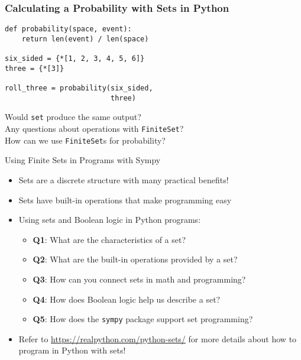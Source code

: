 \documentclass[14pt,aspectratio=169]{beamer}
\begin{document}
%
\begin{frame}[fragile]
  \frametitle{Calculating a Probability with Sets in Python}
  \normalsize
  \begin{minipage}{6in}
    \vspace*{.25in}
    \begin{verbatim}
def probability(space, event):
    return len(event) / len(space)

six_sided = {*[1, 2, 3, 4, 5, 6]}
three = {*[3]}

roll_three = probability(six_sided,
                         three)
    \end{verbatim}
  \end{minipage}
  \vspace*{.25in}
  \begin{center}
    \normalsize \noindent Would {\tt set} produce the same output? \\
    \normalsize \noindent Any questions about operations with {\tt FiniteSet}? \\
    \normalsize \noindent How can we use {\tt FiniteSet}s for probability? \\
  \end{center}
\end{frame}

%
\begin{frame}{Using Finite Sets in Programs with Sympy}
  \begin{itemize}
    \item Sets are a discrete structure with many practical benefits!
      \vspace*{-.2in}
    \item Sets have built-in operations that make programming easy
      \vspace*{-.2in}
    \item Using sets and Boolean logic in Python programs:
      \begin{itemize}
        \item {\bf Q1}: What are the characteristics of a set?
        \item {\bf Q2}: What are the built-in operations provided by a set?
        \item {\bf Q3}: How can you connect sets in math and programming?
        \item {\bf Q4}: How does Boolean logic help us describe a set?
        \item {\bf Q5}: How does the {\tt sympy} package support set programming?
      \end{itemize}
      \vspace*{-.2in}
    \item Refer to \url{https://realpython.com/python-sets/} for more details
      about how to program in Python with sets!
  \end{itemize}
\end{frame}
\end{document}
